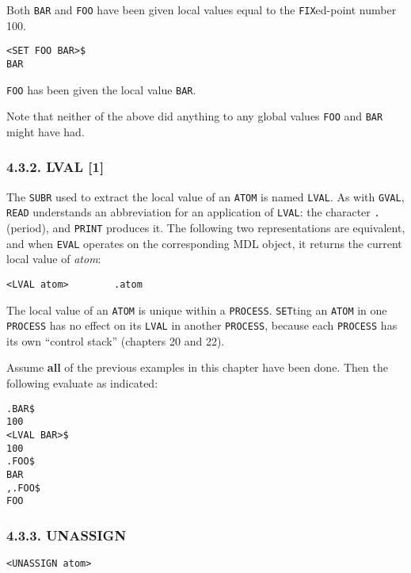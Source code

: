 \documentclass[a4paper,]{article}
\begin{document}
Both \texttt{BAR} and \texttt{FOO} have been given local values equal to the \texttt{FIX}ed-point number 100.

\begin{verbatim}
<SET FOO BAR>$
BAR
\end{verbatim}

\texttt{FOO} has been given the local value \texttt{BAR}.

Note that neither of the above did anything to any global values \texttt{FOO} and \texttt{BAR} might have had.

\subsubsection{4.3.2. LVAL {[}1{]}}\label{lval-1}

The \texttt{SUBR} used to extract the local value of an \texttt{ATOM} is named \texttt{LVAL}.
As with \texttt{GVAL}, \texttt{READ} understands an abbreviation for an application of \texttt{LVAL}: the character
\texttt{.}  (period), and \texttt{PRINT} produces it. The following two representations are
equivalent, and when \texttt{EVAL} operates on the corresponding MDL object, it returns the current local value of
\emph{atom}:

\begin{verbatim}
<LVAL atom>        .atom
\end{verbatim}

The local value of an \texttt{ATOM} is unique within a \texttt{PROCESS}. \texttt{SET}ting an \texttt{ATOM} in one
\texttt{PROCESS} has no effect on its \texttt{LVAL} in another \texttt{PROCESS}, because each \texttt{PROCESS} has its own
``control stack'' (chapters 20 and 22).

Assume \textbf{all} of the previous examples in this chapter have been done. Then the following evaluate as indicated:

\begin{verbatim}
.BAR$
100
<LVAL BAR>$
100
.FOO$
BAR
,.FOO$
FOO
\end{verbatim}

\subsubsection{4.3.3. UNASSIGN}\label{unassign}

\begin{verbatim}
<UNASSIGN atom>
\end{verbatim}
\end{document}

